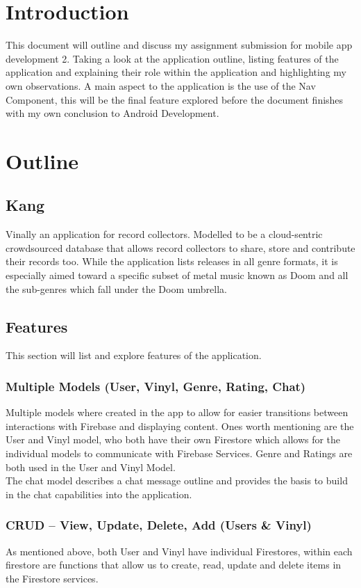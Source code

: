 \section{Introduction}
This document will outline and discuss my assignment submission for mobile app development 2. Taking a look at the application outline, listing features of the application and explaining their role within the application and highlighting my own observations. A main aspect to the application is the use of the Nav Component, this will be the final feature explored before the document finishes with my own conclusion to Android Development.

\section{Outline}
\subsection{Kang}
Vinally an application for record collectors. Modelled to be a cloud-sentric crowdsourced database that allows record collectors to share, store and contribute their records too. While the application lists releases in all genre formats, it is especially aimed toward a specific subset of metal music known as Doom and all the sub-genres which fall under the Doom umbrella.

\subsection{Features}
This section will list and explore features of the application.

\subsubsection{ Multiple Models (User, Vinyl, Genre, Rating, Chat)}
Multiple models where created in the app to allow for easier transitions between interactions with Firebase and displaying content. Ones worth mentioning are the User and Vinyl model, who both have their own Firestore which allows for the individual models to communicate with Firebase Services. Genre and Ratings are both used in the User and Vinyl Model.
\\The chat model describes a chat message outline and provides the basis to build in the chat capabilities into the application.

\subsubsection{ CRUD -- View, Update, Delete, Add (Users \& Vinyl) }
As mentioned above, both User and Vinyl have individual Firestores, within each firestore are functions that allow us to create, read, update and delete items in the Firestore services.

